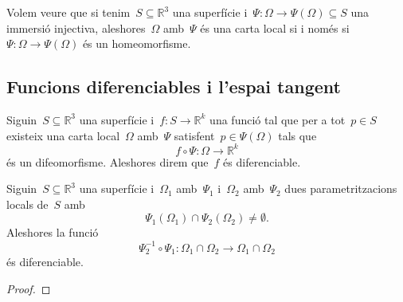 \documentclass[../../main.tex]{subfiles}
\begin{document}
    \begin{example}
        Volem veure que si tenim~\(S\subseteq\mathbb{R}^{3}\) una superfície i~\(\Psi\colon\Omega\longrightarrow\Psi(\Omega)\subseteq S\) una immersió injectiva, aleshores~\(\Omega\) amb~\(\Psi\) és una carta local si i només si~\(\Psi\colon\Omega\longrightarrow\Psi(\Omega)\) és un homeomorfisme.
        \begin{solution}
        \end{solution}
    \end{example}
    \subsection{Funcions diferenciables i l'espai tangent}
    \begin{definition}
        \label{def:funció diferenciable}
        Siguin~\(S\subseteq\mathbb{R}^{3}\) una superfície i~\(f\colon S\longrightarrow\mathbb{R}^{k}\) una funció tal que per a tot~\(p\in S\) existeix una carta local~\(\Omega\) amb~\(\Psi\) satisfent~\(p\in\Psi(\Omega)\) tals que
        \[
            f\circ\Psi\colon\Omega\longrightarrow\mathbb{R}^{k}
        \]
        és un difeomorfisme.
        Aleshores direm que~\(f\) és diferenciable.
    \end{definition}
    \begin{theorem}
        \label{thm:la composició de parametritzacions locals és una funció diferenciable}
        Siguin~\(S\subseteq\mathbb{R}^{3}\) una superfície i~\(\Omega_{1}\) amb~\(\Psi_{1}\) i~\(\Omega_{2}\) amb~\(\Psi_{2}\) dues parametritzacions locals de~\(S\) amb
        \[
            \Psi_{1}(\Omega_{1})\cap\Psi_{2}(\Omega_{2})\neq\emptyset.
        \]
        Aleshores la funció
        \[
            \Psi_{2}^{-1}\circ\Psi_{1}\colon\Omega_{1}\cap\Omega_{2}\longrightarrow\Omega_{1}\cap\Omega_{2}
        \]
        és diferenciable.
        \begin{proof}
%
        \end{proof}
    \end{theorem}
\end{document}
